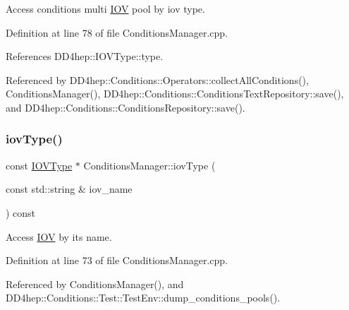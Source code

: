 Access conditions multi \hyperlink{class_d_d4hep_1_1_i_o_v}{I\+OV} pool by iov type. 



Definition at line 78 of file Conditions\+Manager.\+cpp.



References D\+D4hep\+::\+I\+O\+V\+Type\+::type.



Referenced by D\+D4hep\+::\+Conditions\+::\+Operators\+::collect\+All\+Conditions(), Conditions\+Manager(), D\+D4hep\+::\+Conditions\+::\+Conditions\+Text\+Repository\+::save(), and D\+D4hep\+::\+Conditions\+::\+Conditions\+Repository\+::save().

\hypertarget{class_d_d4hep_1_1_conditions_1_1_conditions_manager_aa0c346855c21c5a98bd4410504da28ce}{}\label{class_d_d4hep_1_1_conditions_1_1_conditions_manager_aa0c346855c21c5a98bd4410504da28ce} 
\subsubsection{\texorpdfstring{iov\+Type()}{iovType()}}
{\footnotesize\ttfamily const \hyperlink{class_d_d4hep_1_1_i_o_v_type}{I\+O\+V\+Type} $\ast$ Conditions\+Manager\+::iov\+Type (\begin{DoxyParamCaption}\item[{const std\+::string \&}]{iov\+\_\+name }\end{DoxyParamCaption}) const}



Access \hyperlink{class_d_d4hep_1_1_i_o_v}{I\+OV} by its name. 



Definition at line 73 of file Conditions\+Manager.\+cpp.



Referenced by Conditions\+Manager(), and D\+D4hep\+::\+Conditions\+::\+Test\+::\+Test\+Env\+::dump\+\_\+conditions\+\_\+pools().

\hypertarget{class_d_d4hep_1_1_conditions_1_1_conditions_manager_a6182a2159f3063306446cad03b47ba77}{}\label{class_d_d4hep_1_1_conditions_1_1_conditions_manager_a6182a2159f3063306446cad03b47ba77} 
